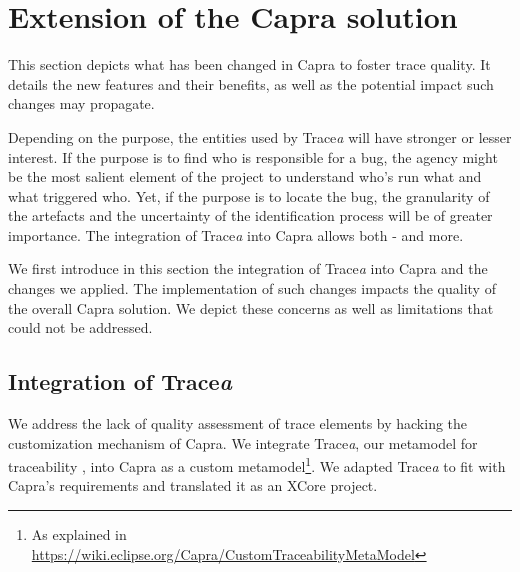 \section{Extension of the Capra solution}\label{sec:extension}
This section depicts what has been changed in Capra to foster trace quality. It details the new features and their benefits, as well as the potential impact such changes may propagate.
\sideboxend

Depending on the purpose, the entities used by Trace\textit{a} will have stronger or lesser interest. If the purpose is to find who is responsible for a bug, the agency might be the most salient element of the project to understand who's run what and what triggered who. Yet, if the purpose is to locate the bug, the granularity of the artefacts and the uncertainty of the identification process will be of greater importance. The integration of Trace\textit{a} into Capra allows both - and more.


We first introduce in this section the integration of Trace\textit{a} into Capra and the changes we applied.
The implementation of such changes impacts the quality of the overall Capra solution. We depict these concerns as well as limitations that could not be addressed.



\subsection{Integration of Trace\textit{a}}
We address the lack of quality assessment of trace elements by hacking the customization mechanism of Capra. We integrate Trace\textit{a}, our metamodel for traceability \cite{batot2021-not-another-metamodel}, into Capra as a custom metamodel\footnote{As explained in \url{https://wiki.eclipse.org/Capra/CustomTraceabilityMetaModel}}. We adapted Trace\textit{a} to fit with Capra's requirements and translated it as an XCore project. 

\begin{descriptioncompact}
    \item[1 -- Add trace quality to Capra's metamodel] 
    \item[2 -- Extend Capra's core interface]
    \item[3 -- Augment Capra's user experience]
\end{descriptioncompact}

